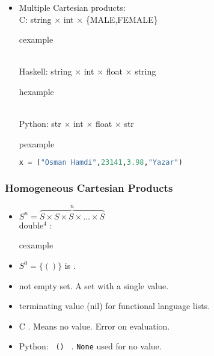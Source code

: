 \begin{frame}[fragile]
\begin{itemize}
 \item Multiple Cartesian products:\\
C: string $\times$ int $\times$ \{MALE,FEMALE\}
\begin{beamercolorbox}{cexample}
 \codecartC
\end{beamercolorbox}\\
Haskell: string $\times$ int $\times$ float $\times$ string
\begin{beamercolorbox}{hexample}
 \codecartH
\end{beamercolorbox}\\
Python: str $\times$ int $\times$ float $\times$ str
\begin{beamercolorbox}{pexample}
\begin{lstlisting}[language=python]
x = ("Osman Hamdi",23141,3.98,"Yazar")
\end{lstlisting}
\end{beamercolorbox}
\end{itemize}

\end{frame}


\begin{frame}
\frametitle{Homogeneous Cartesian Products}
\begin{itemize}
 \item $S^n = \overbrace{S \times S \times S \times ... \times S}^{n}$\\
double$^4$ :
\begin{beamercolorbox}{cexample}
\codehomC 
\end{beamercolorbox}
\item $S^0 = \{ () \}$ is .
\item \alert{not} empty set. A set with a single value.
\item terminating value (nil) for functional language lists.
\item C \texttt{}. Means no value. Error on evaluation.
\item Python: \texttt{ () } . \lstinline!None! used for no value.
\end{itemize}
\end{frame}

